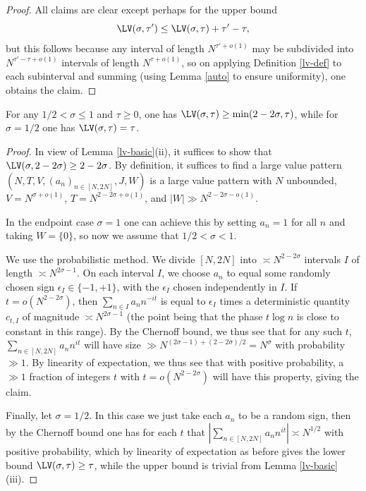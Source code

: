 
\begin{proof}
All claims are clear except perhaps for the upper bound
$$ \LV(\sigma,\tau') \leq \LV(\sigma,\tau) + \tau'-\tau,$$
but this follows because any interval of length $N^{\tau'+o(1)}$ may be subdivided into $N^{\tau'-\tau+o(1)}$ intervals of length $N^{\tau+o(1)}$, so on applying Definition \ref{lv-def} to each subinterval and summing (using Lemma \ref{auto} to ensure uniformity), one obtains the claim.
\end{proof}

\begin{lemma}\label{lv-lower}  For any $1/2 < \sigma \leq 1$ and $\tau \geq 0$, one has $\LV(\sigma, \tau) \geq \min(2 - 2 \sigma,\tau)$, while for $\sigma=1/2$ one has $\LV(\sigma,\tau) = \tau$.
\end{lemma}

\begin{proof} In view of Lemma \ref{lv-basic}(ii), it suffices to show that $\LV(\sigma, 2-2\sigma) \geq 2-2\sigma$.  By definition, it suffices to find a large value pattern $(N,T,V,(a_n)_{n \in [N,2N]},J,W)$ is a large value pattern with $N$ unbounded, $V=N^{\sigma+o(1)}$, $T = N^{2-2\sigma+o(1)}$, and $|W| \gg N^{2-2\sigma-o(1)}$.

In the endpoint case $\sigma = 1$ one can achieve this by setting $a_n=1$ for all $n$ and taking $W=\{0\}$, so now we assume that $1/2 < \sigma<1$.

We use the probabilistic method.  We divide $[N,2N]$ into $\asymp N^{2-2\sigma}$ intervals $I$ of length $\asymp N^{2\sigma-1}$.  On each interval $I$, we choose $a_n$ to equal some randomly chosen sign $\epsilon_I \in \{-1,+1\}$, with the $\epsilon_I$ chosen independently in $I$.  If $t = o(N^{2-2\sigma})$, then $\sum_{n \in I} a_n n^{-it}$ is equal to $\epsilon_I$ times a deterministic quantity $c_{t,I}$ of magnitude $\asymp N^{2\sigma-1}$ (the point being that the phase $t \log n$ is close to constant in this range).  By the Chernoff bound, we thus see that for any such $t$, $\sum_{n \in [N,2N]} a_n n^{it}$ will have size $\gg N^{(2\sigma-1) + (2-2\sigma)/2} = N^\sigma$ with probability $\gg 1$. By linearity of expectation, we thus see that with positive probability, a $\gg 1$ fraction of integers $t$ with $t = o(N^{2-2\sigma})$ will have this property, giving the claim.

Finally, let $\sigma=1/2$.  In this case we just take each $a_n$ to be a random sign, then by the Chernoff bound one has for each $t$ that $|\sum_{n \in [N,2N]} a_n n^{it}| \asymp N^{1/2}$ with positive probability, which by linearity of expectation as before gives the lower bound $\LV(\sigma,\tau) \geq \tau$, while the upper bound is trivial from Lemma \ref{lv-basic}(iii).
\end{proof}


